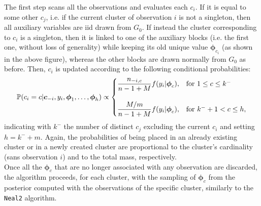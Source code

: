 The first step scans all the observations and evaluates each $c_i$.
If it is equal to some other $c_j$, i.e. if the current cluster of observation $i$ is not a singleton, then all auxiliary variables are iid drawn from $G_0$.
If instead the cluster corresponding to $c_i$ is a singleton, then it is linked to one of the auxiliary blocks (i.e. the first one, without loss of generality) while keeping its old unique value $\boldsymbol\phi_{c_i}$ (as shown in the above figure), whereas the other blocks are drawn normally from $G_0$ as before.
Then, $c_i$ is updated according to the following conditional probabilities:
\begin{equation}
	\begin{aligned} \label{neal8prob}
		\mathbb P(c_{i}=c | \boldsymbol c_{-i}, y_{i}, \boldsymbol\phi_{1},\dots,\boldsymbol\phi_{h}) \propto
		\begin{cases}
			\dfrac{n_{-i,c}}{n-1+M}f(y_{i}|\boldsymbol\phi_{c}), & \mbox{for } 1 \leq c \leq k^{-} \\
			\\
			\dfrac{M/m}{n-1+M}f(y_{i}|\boldsymbol\phi_{c}), & \mbox{for } k^{-}+1 < c \leq h,
		\end{cases}
	\end{aligned}
\end{equation}
indicating with $k^{-}$ the number of distinct $c_j$ excluding the current $c_i$ and setting $h=k^{-}+m$.
Again, the probabilities of being placed in an already existing cluster or in a newly created cluster are proportional to the cluster's cardinality (sans observation $i$) and to the total mass, respectively. \\
Once all the $\boldsymbol\phi_c$ that are no longer associated with any observation are discarded, the algorithm proceeds, for each cluster, with the sampling of $\boldsymbol\phi_c$ from the posterior computed with the observations of the specific cluster, similarly to the \verb|Neal2| algorithm.

